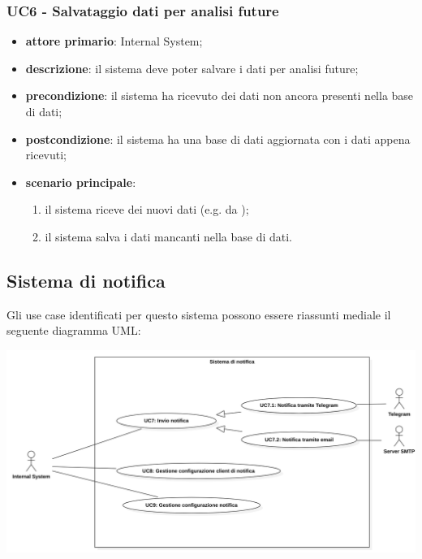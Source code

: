 \subsubsection{UC6 - Salvataggio dati per analisi future}
\begin{itemize}
	\item \textbf{attore primario}: Internal System;
	\item \textbf{descrizione}: il sistema deve poter salvare i dati per analisi future;
	\item \textbf{precondizione}: il sistema ha ricevuto dei dati non ancora presenti nella base di dati;
	\item \textbf{postcondizione}: il sistema ha una base di dati aggiornata con i dati appena ricevuti;
	\item \textbf{scenario principale}: 
	\begin{enumerate}
		\item il sistema riceve dei nuovi dati (e.g. da );
		\item il sistema salva i dati mancanti nella base di dati.
	\end{enumerate}
\end{itemize}
\subsection{Sistema di notifica}
Gli use case identificati per questo sistema possono essere riassunti mediale il seguente diagramma UML:
\begin{center}
	\includegraphics[keepaspectratio = true, width=15cm]{immagini/uc/5.png}
\end{center}

